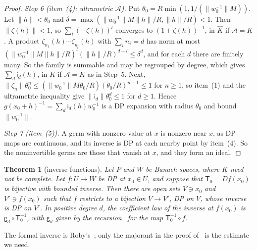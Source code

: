 \documentclass[11pt]{amsart}
\newtheorem{theorem}{Theorem}[section]
\theoremstyle{definition}
\theoremstyle{remark}
\numberwithin{equation}{section}
\newcommand{\norm}[1]{\lVert #1\rVert}
\newcommand{\Kh}{\widehat K}
\theoremstyle{plain}
\theoremstyle{definition}
\theoremstyle{plain}
\begin{document}
\begin{proof}
\emph{Step 6 (item~(4): ultrametric $\mathcal A$).} Put $\theta_0=R\min(1,1/(\norm{w_0^{-1}}M))$. Let $\norm h<\theta_0$ and $\delta=\max(\norm{w_0^{-1}}M\norm h/R,\norm h/R)<1$. Then $\norm{\zeta(h)}<1$, so $\sum_l(-\zeta(h))^l$ converges to $(1+\zeta(h))^{-1}$, in $\Kh$ if $\mathcal A=K$. A product $\zeta_{n_1}(h)\cdots\zeta_{n_l}(h)$ with $\sum_in_i=d$ has norm at most $(\norm{w_0^{-1}}M\norm h/R)^l(\norm h/R)^{d-l}\le\delta^d$, and for each $d$ there are finitely many. So the family is summable and may be regrouped by degree, which gives $\sum_d\mathsf i_d(h)$, in $K$ if $\mathcal A=K$ as in Step~5. Next, $\norm{\zeta_n}\theta_0^n\le(\norm{w_0^{-1}}M\theta_0/R)(\theta_0/R)^{n-1}\le1$ for $n\ge1$, so item~(1) and the ultrametric inequality give $\norm{\mathsf i_d}\theta_0^d\le1$ for $d\ge1$. Hence $g(x_0+h)^{-1}=\sum_d\mathsf i_d(h)w_0^{-1}$ is a DP expansion with radius $\theta_0$ and bound $\norm{w_0^{-1}}$.

\emph{Step 7 (item~(5)).} A germ with nonzero value at $x$ is nonzero near $x$, as DP maps are continuous, and its inverse is DP at each nearby point by item~(4). So the noninvertible germs are those that vanish at $x$, and they form an ideal.
\end{proof}

\begin{theorem}[inverse functions]\label{dp:thm:inverse}
Let $P$ and $W$ be Banach spaces, where $K$ need not be complete. Let $f\colon U\to W$ be DP at $x_0\in U$, and suppose that $\mathsf T_0=Df(x_0)$ is bijective with bounded inverse. Then there are open sets $V\ni x_0$ and $V'\ni f(x_0)$ such that $f$ restricts to a bijection $V\to V'$, DP on $V$, whose inverse is DP on $V'$. In positive degree $d$, the coefficient law of the inverse at $f(x_0)$ is $\mathsf g_d\circ\mathsf T_0^{-1}$, with $\mathsf g_d$ given by the recursion~\cite[(Q.14)]{I} for the map $\mathsf T_0^{-1}\circ f$.
\end{theorem}

The formal inverse is Roby's~\cite[Th.~VI.3, Prop.~VI.8]{Ro}; only the majorant in the proof of~\cite[Lemma~Q.14]{I} is the estimate we need.
\end{document}
